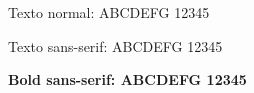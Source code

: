 \documentclass{memoir}
\begin{document}
Texto normal: ABCDEFG 12345

{\sffamily Texto sans-serif: ABCDEFG 12345}

{\sffamily\bfseries Bold sans-serif: ABCDEFG 12345}
\end{document}
